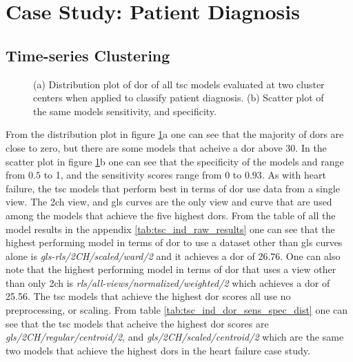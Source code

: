 \section{Case Study: Patient Diagnosis}

\subsection{Time-series Clustering}

\begin{figure}[H]
    \centering
    
    \caption{(a) Distribution plot of \acrshort{dor} of all \acrshort{tsc} models evaluated at two cluster centers when applied to classify patient diagnosis.
             (b) Scatter plot of the same models sensitivity, and specificity.}
    \label{fig:tsc_ind_dor_sens_spec_dist}
\end{figure}

From the distribution plot in figure \ref{fig:tsc_ind_dor_sens_spec_dist}a one can see that the majority of \acrshort{dor}s are close to zero, but there are some models that acheive a \acrshort{dor} above 30.
In the scatter plot in figure \ref{fig:tsc_ind_dor_sens_spec_dist}b one can see that the specificity of the models and range from $0.5$ to 1, 
and the sensitivity scores range from 0 to $0.93$. 
As with heart failure, the \acrshort{tsc} models that perform best in terms of \acrshort{dor} use data from a single view. 
The \acrshort{2ch} view, and \acrshort{gls} curves are the only view and curve that are used among the models that achieve the five highest \acrshort{dor}s.
From the table of all the model results in the appendix \ref{tab:tsc_ind_raw_results} one can see that the highest performing model in terms of \acrshort{dor}
to use a dataset other than \acrshort{gls} curves alone is \textit{gls-rls/2CH/scaled/ward/2} and it achieves a \acrshort{dor} of $26.76$.
One can also note that the highest performing model in terms of \acrshort{dor} that uses a view other than only \acrshort{2ch} is \textit{rls/all-views/normalized/weighted/2}
which achieves a \acrshort{dor} of 25.56.
The \acrshort{tsc} models that achieve the highest \acrshort{dor} scores all use no preprocessing, or scaling. 
From table \ref{tab:tsc_ind_dor_sens_spec_dist} one can see that the \acrshort{tsc} models that acheive the highest \acrshort{dor} scores are \textit{gls/2CH/regular/centroid/2}, 
and \textit{gls/2CH/scaled/centroid/2} which are the same two models that achieve the highest \acrshort{dor}s in the heart failure case study.

